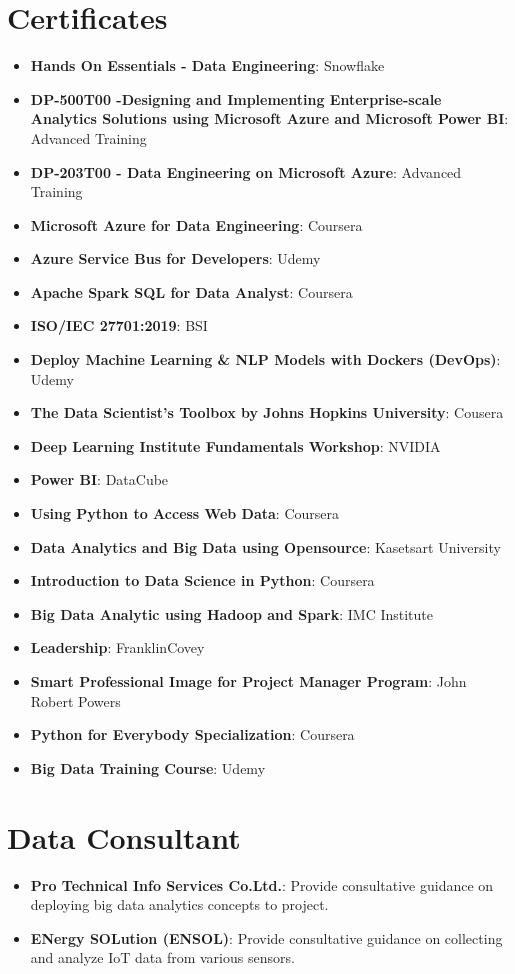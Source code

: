 \documentclass[letterpaper,11pt]{article}
\newcommand{\resumeItem}[2]{
  \item\small{
    \textbf{#1}{: #2 \vspace{-2pt}}
  }
}
\newcommand{\resumeSubItem}[2]{\resumeItem{#1}{#2}\vspace{-4pt}}
\newcommand{\resumeSubHeadingListStart}{\begin{itemize}[leftmargin=*]}
\newcommand{\resumeSubHeadingListEnd}{\end{itemize}}
\begin{document}
\section{Certificates}
  \resumeSubHeadingListStart
  \resumeSubItem{Hands On Essentials - Data Engineering}{Snowflake}
  \resumeSubItem{DP-500T00 -Designing and Implementing Enterprise-scale Analytics Solutions using Microsoft Azure and Microsoft Power BI}{Advanced Training}
  \resumeSubItem{DP-203T00 - Data Engineering on Microsoft Azure}{Advanced Training}
  \resumeSubItem{Microsoft Azure for Data Engineering}{Coursera}
  \resumeSubItem{Azure Service Bus for Developers}{Udemy}
  \resumeSubItem{Apache Spark SQL for Data Analyst}{Coursera}
  \resumeSubItem{ISO/IEC 27701:2019}{BSI}
  \resumeSubItem{Deploy Machine Learning \& NLP Models with Dockers (DevOps)}{Udemy}
  \resumeSubItem{The Data Scientist’s Toolbox by Johns Hopkins University}{Cousera}
  \resumeSubItem{Deep Learning Institute Fundamentals Workshop}{NVIDIA}
  \resumeSubItem{Power BI}{DataCube}
  \resumeSubItem{Using Python to Access Web Data}{Coursera}  
  \resumeSubItem{Data Analytics and Big Data using Opensource}{Kasetsart University}
  \resumeSubItem{Introduction to Data Science in Python}{Coursera}   
  \resumeSubItem{Big Data Analytic using Hadoop and Spark}{IMC Institute}
  \resumeSubItem{Leadership}{FranklinCovey}
  \resumeSubItem{Smart Professional Image for Project Manager Program}{John Robert Powers}
  \resumeSubItem{Python for Everybody Specialization}{Coursera}
  \resumeSubItem{Big Data Training Course}{Udemy}         
  \resumeSubHeadingListEnd


  \section{Data Consultant}
  \resumeSubHeadingListStart
  \resumeSubItem{Pro Technical Info Services Co.Ltd.}{Provide consultative guidance on deploying big data analytics concepts to project.}
  \resumeSubItem{ENergy SOLution (ENSOL)}{Provide consultative guidance on collecting and analyze IoT data from various sensors.}     
  \resumeSubHeadingListEnd

\end{document}
